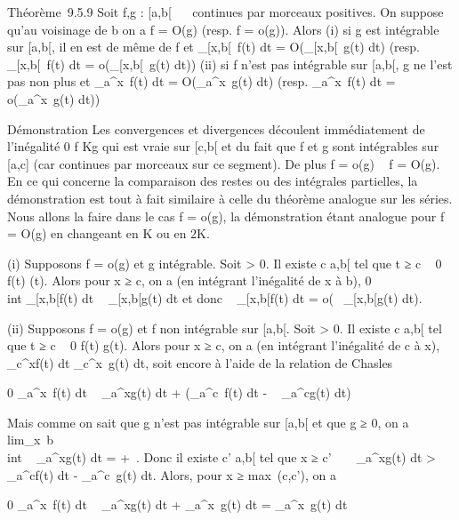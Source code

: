 \documentclass[]{article}
\begin{document}
Théorème~9.5.9 Soit f,g : {[}a,b{[}\rightarrow~ ~ continues par morceaux positives.
On suppose qu'au voisinage de b on a f = O(g) (resp. f = o(g)). Alors
(i) si g est intégrable sur {[}a,b{[}, il en est de même de f et
\int  \_{[}x,b{[}~f(t) dt =
O(\int  \_{[}x,b{[}~g(t) dt) (resp.
\int  \_{[}x,b{[}~f(t) dt =
o(\int  \_{[}x,b{[}~g(t) dt)) (ii) si f
n'est pas intégrable sur {[}a,b{[}, g ne l'est pas non plus et
\int  \_a^x~f(t) dt =
O(\int  \_a^x~g(t) dt) (resp.
\int  \_a^x~f(t) dt =
o(\int  \_a^x~g(t) dt))

Démonstration Les convergences et divergences découlent immédiatement de
l'inégalité 0 \leq f \leq Kg qui est vraie sur {[}c,b{[} et du fait que f et g
sont intégrables sur {[}a,c{]} (car continues par morceaux sur ce
segment). De plus f = o(g) \rigtharrow~ f = O(g). En ce qui concerne la comparaison
des restes ou des intégrales partielles, la démonstration est tout à
fait similaire à celle du théorème analogue sur les séries. Nous allons
la faire dans le cas f = o(g), la démonstration étant analogue pour f =
O(g) en changeant \epsilon en K ou en 2K.

(i) Supposons f = o(g) et g intégrable. Soit \epsilon \textgreater{} 0. Il
existe c \in {[}a,b{[} tel que t ≥ c \rigtharrow~ 0 \leq f(t) \leq \epsilong(t). Alors pour x ≥ c,
on a (en intégrant l'inégalité de x à b), 0 \leq\\int
 \_{[}x,b{[}f(t) dt \leq \epsilon\int ~
\_{[}x,b{[}g(t) dt et donc \int ~
\_{[}x,b{[}f(t) dt = o(\int ~
\_{[}x,b{[}g(t) dt).

(ii) Supposons f = o(g) et f non intégrable sur {[}a,b{[}. Soit \epsilon
\textgreater{} 0. Il existe c \in {[}a,b{[} tel que t ≥ c \rigtharrow~ 0 \leq f(t) \leq \epsilon
{} g(t). Alors pour x ≥ c, on a (en intégrant
l'inégalité de c à x), \int ~
\_c^xf(t) dt \leq \epsilon {}
\int  \_c^x~g(t) dt, soit encore à
l'aide de la relation de Chasles

0 \leq\int  \_a^x~f(t) dt \leq \epsilon
{} \int ~
\_a^xg(t) dt + \left
(\int  \_a^c~f(t) dt - \epsilon
{} \int ~
\_a^cg(t) dt\right )

Mais comme on sait que g n'est pas intégrable sur {[}a,b{[} et que g ≥
0, on a
lim\_x\rightarrow~b\\int ~
\_a^xg(t) dt = +\infty~. Donc il existe c' \in {[}a,b{[} tel que x
≥ c' \rigtharrow~ \epsilon {} \int ~
\_a^xg(t) dt \textgreater{}\int ~
\_a^cf(t) dt - \epsilon {}
\int  \_a^c~g(t) dt. Alors, pour x
≥ max~(c,c'), on a

0 \leq\int  \_a^x~f(t) dt \leq \epsilon
{} \int ~
\_a^xg(t) dt + \epsilon {}
\int  \_a^x~g(t) dt =
\epsilon\int  \_a^x~g(t) dt
\end{document}
